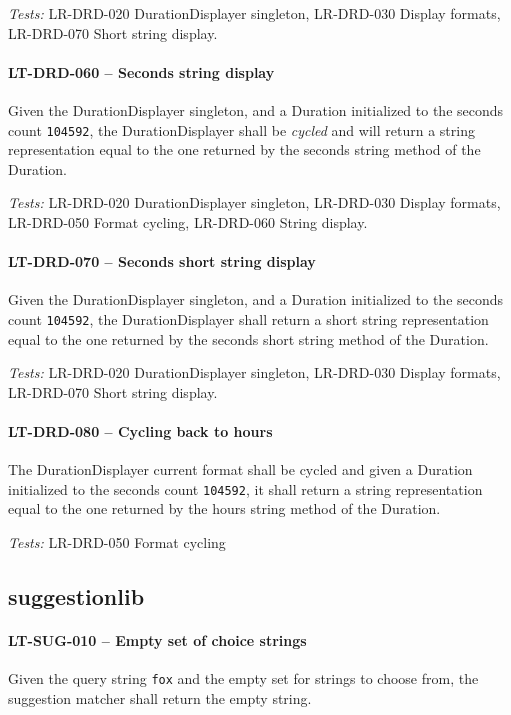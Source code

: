 \textit{Tests: } LR-DRD-020 DurationDisplayer singleton,
LR-DRD-030 Display formats, LR-DRD-070 Short string
display.

\paragraph{LT-DRD-060 -- Seconds string display}
Given the DurationDisplayer singleton, and a Duration initialized
to the seconds count \lstinline{104592}, the DurationDisplayer
shall be \emph{cycled} and will return a string representation equal to
the one returned by the seconds string method of the Duration.

\textit{Tests: } LR-DRD-020 DurationDisplayer singleton,
LR-DRD-030 Display formats, LR-DRD-050 Format cycling, LR-DRD-060 String
display.

\paragraph{LT-DRD-070 -- Seconds short string display}
Given the DurationDisplayer singleton, and a Duration initialized
to the seconds count \lstinline{104592}, the DurationDisplayer
shall return a short string representation equal to
the one returned by the seconds short string method of the Duration.

\textit{Tests: } LR-DRD-020 DurationDisplayer singleton,
LR-DRD-030 Display formats, LR-DRD-070 Short string
display.

\paragraph{LT-DRD-080 -- Cycling back to hours}
The DurationDisplayer current format shall be cycled and
given a Duration initialized to the seconds count \lstinline{104592},
it shall return a string representation equal to the one returned
by the hours string method of the Duration.

\textit{Tests: } LR-DRD-050 Format cycling

\subsection{suggestion\textunderscore lib}
\paragraph{LT-SUG-010 -- Empty set of choice strings}
Given the query string \lstinline{fox} and the empty set for strings
to choose from, the suggestion matcher shall return the empty string.

